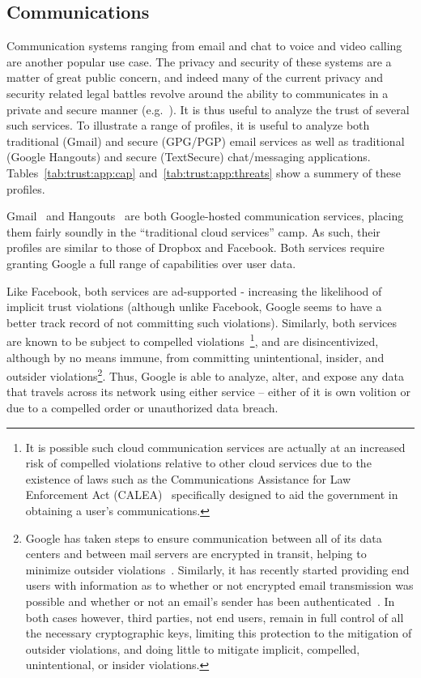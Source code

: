 \subsection{Communications}

Communication systems ranging from email and chat to voice and video
calling are another popular use case. The privacy and security of
these systems are a matter of great public concern, and indeed many of
the current privacy and security related legal battles revolve around
the ability to communicates in a private and secure manner
(e.g.~\cite{apple-fbiletter, greenwald-prism, levsion-lavabit}). It is
thus useful to analyze the trust of several such services. To
illustrate a range of profiles, it is useful to analyze both
traditional (Gmail) and secure (GPG/PGP) email services as well as
traditional (Google Hangouts) and secure (TextSecure) chat/messaging
applications. Tables~\ref{tab:trust:app:cap}
and~\ref{tab:trust:app:threats} show a summery of these profiles.

Gmail~\cite{google-gmail} and Hangouts~\cite{google-hangouts} are both
Google-hosted communication services, placing them fairly soundly in
the ``traditional cloud services'' camp. As such, their profiles are
similar to those of Dropbox and Facebook. Both services require
granting Google a full range of capabilities over user data.

Like Facebook, both services are ad-supported - increasing the
likelihood of implicit trust violations (although unlike Facebook,
Google seems to have a better track record of not committing such
violations). Similarly, both services are known to be subject to
compelled violations~\cite{google-transparency}\footnote{It is
  possible such cloud communication services are actually at an
  increased risk of compelled violations relative to other cloud
  services due to the existence of laws such as the Communications
  Assistance for Law Enforcement Act (CALEA)~\cite{calea-usc,
    calea-fcc} specifically designed to aid the government in
  obtaining a user's communications.}, and are disincentivized,
although by no means immune, from committing unintentional, insider,
and outsider violations\footnote{Google has taken steps to ensure
  communication between all of its data centers and between mail
  servers are encrypted in transit, helping to minimize outsider
  violations~\cite{gmail-blog-encryption}. Similarly, it has recently
  started providing end users with information as to whether or not
  encrypted email transmission was possible and whether or not an
  email's sender has been authenticated~\cite{gmail-blog-indicators}.
  In both cases however, third parties, not end users, remain in full
  control of all the necessary cryptographic keys, limiting this
  protection to the mitigation of outsider violations, and doing
  little to mitigate implicit, compelled, unintentional, or insider
  violations.}. Thus, Google is able to analyze, alter, and expose any
data that travels across its network using either service -- either of
it is own volition or due to a compelled order or unauthorized data
breach.

